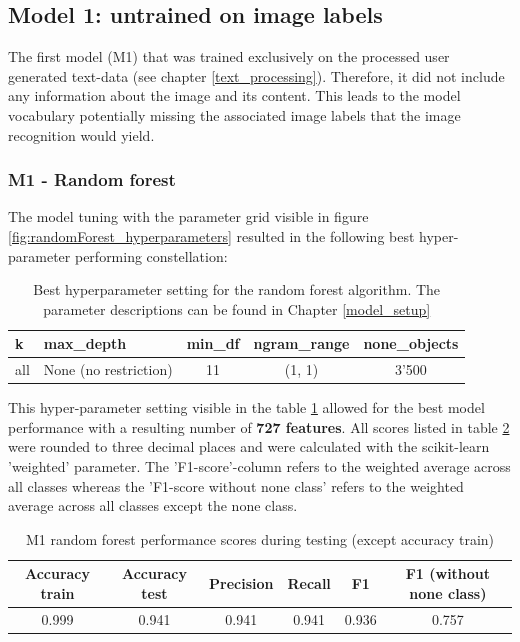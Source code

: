 \subsection{Model 1: untrained on image labels}
The first model (M1) that was trained exclusively on the processed user generated text-data (see chapter \ref{text_processing}). Therefore, it did not include any information about the image and its content. This leads to the model vocabulary potentially missing the associated image labels that the image recognition would yield.

\subsubsection{M1 - Random forest}
The model tuning with the parameter grid visible in figure \ref{fig:randomForest_hyperparameters} resulted in the following best hyper-parameter performing constellation:\\

\begin{table}[ht]
\begin{center}
\caption{Best hyperparameter setting for the random forest algorithm. The parameter descriptions can be found in Chapter \ref{model_setup}}\vspace{1ex}
\label{tab:m1_randomForest_bestParams}
\begin{tabular}{llccc}\hline
k & max\_depth & min\_df & ngram\_range & none\_objects \\ \hline
all & None (no restriction) & 11 & (1, 1) & 3'500 \\ \hline
\end{tabular}
\end{center}
\end{table}

This hyper-parameter setting visible in the table \ref{tab:m1_randomForest_bestParams} allowed for the best model performance with a resulting number of \textbf{727 features}. All scores listed in table \ref{tab:m1_randomForest_bestscores} were rounded to three decimal places and were calculated with the scikit-learn 'weighted' parameter. The 'F1-score'-column refers to the weighted average across all classes whereas the 'F1-score without none class' refers to the weighted average across all classes except the none class.

\begin{table}[ht]
\begin{center}
\caption{M1 random forest performance scores during testing (except accuracy train)}\vspace{1ex}
\label{tab:m1_randomForest_bestscores}
\begin{tabular}{cccccc}\hline
Accuracy train & Accuracy test & Precision & Recall & F1 & F1 (without none class)\\ \hline
0.999 & 0.941 & 0.941 & 0.941 & 0.936 & 0.757 \\ \hline
\end{tabular}
\end{center}
\end{table}

